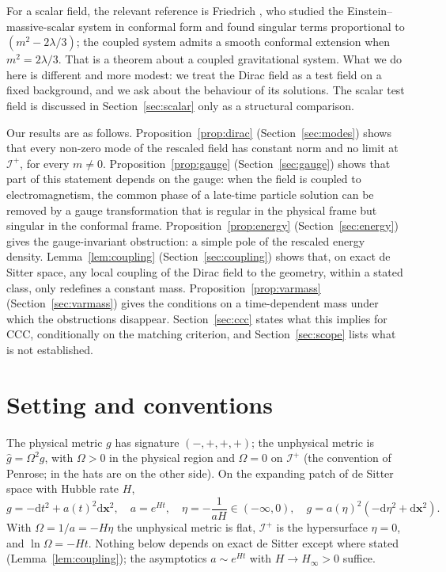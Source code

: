 \documentclass[11pt,a4paper]{article}
\theoremstyle{definition}
\newcommand{\scri}{\mathscr{I}^{+}}
\newcommand{\dd}{\mathrm{d}}
\newcommand{\hg}{\hat g}
\begin{document}
For a scalar field, the relevant reference is Friedrich \cite{Friedrich2014}, who studied the Einstein--massive-scalar system in conformal form and found singular terms proportional to $(m^{2}-2\lambda/3)$; the coupled system admits a smooth conformal extension when $m^{2}=2\lambda/3$. That is a theorem about a coupled gravitational system. What we do here is different and more modest: we treat the Dirac field as a test field on a fixed background, and we ask about the behaviour of its solutions. The scalar test field is discussed in Section~\ref{sec:scalar} only as a structural comparison.

Our results are as follows. Proposition~\ref{prop:dirac} (Section~\ref{sec:modes}) shows that every non-zero mode of the rescaled field has constant norm and no limit at $\scri$, for every $m\neq0$. Proposition~\ref{prop:gauge} (Section~\ref{sec:gauge}) shows that part of this statement depends on the gauge: when the field is coupled to electromagnetism, the common phase of a late-time particle solution can be removed by a gauge transformation that is regular in the physical frame but singular in the conformal frame. Proposition~\ref{prop:energy} (Section~\ref{sec:energy}) gives the gauge-invariant obstruction: a simple pole of the rescaled energy density. Lemma~\ref{lem:coupling} (Section~\ref{sec:coupling}) shows that, on exact de Sitter space, any local coupling of the Dirac field to the geometry, within a stated class, only redefines a constant mass. Proposition~\ref{prop:varmass} (Section~\ref{sec:varmass}) gives the conditions on a time-dependent mass under which the obstructions disappear. Section~\ref{sec:ccc} states what this implies for CCC, conditionally on the matching criterion, and Section~\ref{sec:scope} lists what is not established.

\section{Setting and conventions}
\label{sec:setting}

The physical metric $g$ has signature $(-,+,+,+)$; the unphysical metric is $\hg=\Omega^{2}g$, with $\Omega>0$ in the physical region and $\Omega=0$ on $\scri$ (the convention of Penrose; in \cite{Friedrich2014} the hats are on the other side). On the expanding patch of de Sitter space with Hubble rate $H$,
\begin{equation}
g=-\dd t^{2}+a(t)^{2}\dd\mathbf{x}^{2},\quad a=e^{Ht},\quad \eta=-\frac{1}{aH}\in(-\infty,0),\quad g=a(\eta)^{2}(-\dd\eta^{2}+\dd\mathbf{x}^{2}).
\end{equation}
With $\Omega=1/a=-H\eta$ the unphysical metric is flat, $\scri$ is the hypersurface $\eta=0$, and $\ln\Omega=-Ht$. Nothing below depends on exact de Sitter except where stated (Lemma~\ref{lem:coupling}); the asymptotics $a\sim e^{Ht}$ with $H\to H_{\infty}>0$ suffice.
\end{document}
